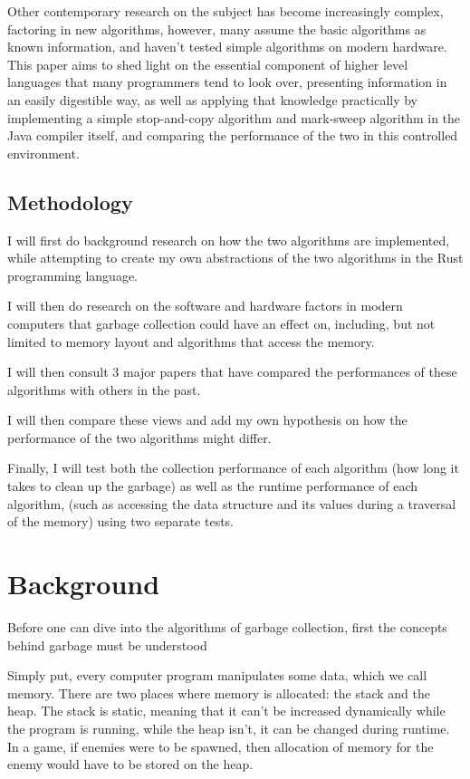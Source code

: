 \documentclass[index]{subfiles}
\begin{document}
Other contemporary research on the subject has become increasingly complex, factoring in new algorithms, however, many assume the basic algorithms as known information, and haven't tested simple algorithms on modern hardware. This paper aims to shed light on the essential component of higher level languages that many programmers tend to look over, presenting information in an easily digestible way, as well as applying that knowledge practically by implementing a simple stop-and-copy algorithm and mark-sweep algorithm in the Java compiler itself, and comparing the performance of the two in this controlled environment.

\subsection{Methodology}

I will first do background research on how the two algorithms are implemented, while attempting to create my own abstractions of the two algorithms in the Rust programming language. 

I will then do research on the software and hardware factors in modern computers that garbage collection could have an effect on, including, but not limited to memory layout and algorithms that access the memory.

I will then consult 3 major papers that have compared the performances of these algorithms with others in the past. 

I will then compare these views and add my own hypothesis on how the performance of the two algorithms might differ.

Finally, I will test both the collection performance of each algorithm (how long it takes to clean up the garbage) as well as the runtime performance of each algorithm, (such as accessing the data structure and its values during a traversal of the memory) using two separate tests.

\section{Background}

Before one can dive into the algorithms of garbage collection, first the concepts behind garbage must be understood

Simply put, every computer program manipulates some data, which we call memory.
There are two places where memory is allocated: the stack and the heap. The stack is static, meaning that it can't be increased dynamically while the program is running, while the heap isn't, it can be changed during runtime. In a game, if enemies were to be spawned, then allocation of memory for the enemy would have to be stored on the heap.
\end{document}
